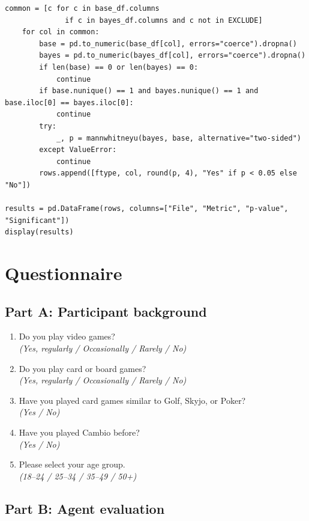 \documentclass[12pt,a4paper,oneside]{report}
\begin{document}
\begin{appendices}
\begin{lstlisting}[style=python]
    common = [c for c in base_df.columns
              if c in bayes_df.columns and c not in EXCLUDE]
    for col in common:
        base = pd.to_numeric(base_df[col], errors="coerce").dropna()
        bayes = pd.to_numeric(bayes_df[col], errors="coerce").dropna()
        if len(base) == 0 or len(bayes) == 0:
            continue
        if base.nunique() == 1 and bayes.nunique() == 1 and base.iloc[0] == bayes.iloc[0]:
            continue
        try:
            _, p = mannwhitneyu(bayes, base, alternative="two-sided")
        except ValueError:
            continue
        rows.append([ftype, col, round(p, 4), "Yes" if p < 0.05 else "No"])

results = pd.DataFrame(rows, columns=["File", "Metric", "p-value", "Significant"])
display(results)
\end{lstlisting}

\chapter{Questionnaire}
\label{app:questionnaire}

\section*{Part A: Participant background}
\begin{enumerate}
  \item Do you play video games?\\
        \emph{(Yes, regularly / Occasionally / Rarely / No)}
  \item Do you play card or board games?\\
        \emph{(Yes, regularly / Occasionally / Rarely / No)}
  \item Have you played card games similar to Golf, Skyjo, or Poker?\\
        \emph{(Yes / No)}
  \item Have you played Cambio before?\\
        \emph{(Yes / No)}
  \item Please select your age group.\\
        \emph{(18--24 / 25--34 / 35--49 / 50+)}
\end{enumerate}

\section*{Part B: Agent evaluation}


\end{appendices}
\end{document}
